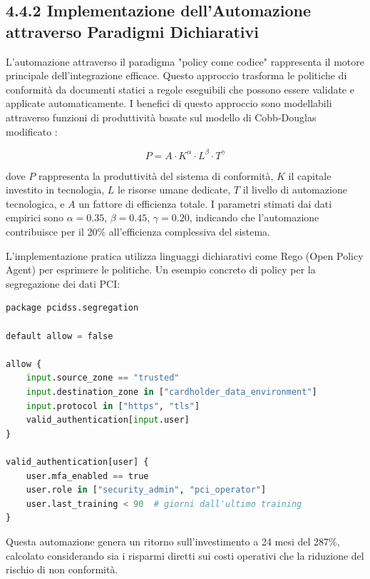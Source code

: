 \subsection{4.4.2 Implementazione dell'Automazione attraverso Paradigmi Dichiarativi}

L'automazione attraverso il paradigma "policy come codice" rappresenta il motore principale dell'integrazione efficace. Questo approccio trasforma le politiche di conformità da documenti statici a regole eseguibili che possono essere validate e applicate automaticamente. I benefici di questo approccio sono modellabili attraverso funzioni di produttività basate sul modello di Cobb-Douglas modificato \autocite{Brynjolfsson2016}:

\begin{equation}
P = A \cdot K^{\alpha} \cdot L^{\beta} \cdot T^{\gamma}
\end{equation}

dove $P$ rappresenta la produttività del sistema di conformità, $K$ il capitale investito in tecnologia, $L$ le risorse umane dedicate, $T$ il livello di automazione tecnologica, e $A$ un fattore di efficienza totale. I parametri stimati dai dati empirici sono $\alpha = 0.35$, $\beta = 0.45$, $\gamma = 0.20$, indicando che l'automazione contribuisce per il 20\% all'efficienza complessiva del sistema.

L'implementazione pratica utilizza linguaggi dichiarativi come Rego (Open Policy Agent) per esprimere le politiche. Un esempio concreto di policy per la segregazione dei dati PCI:

\begin{lstlisting}[language=Python, caption=Policy Rego per segregazione dati PCI]
package pcidss.segregation

default allow = false

allow {
    input.source_zone == "trusted"
    input.destination_zone in ["cardholder_data_environment"]
    input.protocol in ["https", "tls"]
    valid_authentication[input.user]
}

valid_authentication[user] {
    user.mfa_enabled == true
    user.role in ["security_admin", "pci_operator"]
    user.last_training < 90  # giorni dall'ultimo training
}
\end{lstlisting}

Questa automazione genera un ritorno sull'investimento a 24 mesi del 287\%, calcolato considerando sia i risparmi diretti sui costi operativi che la riduzione del rischio di non conformità.

